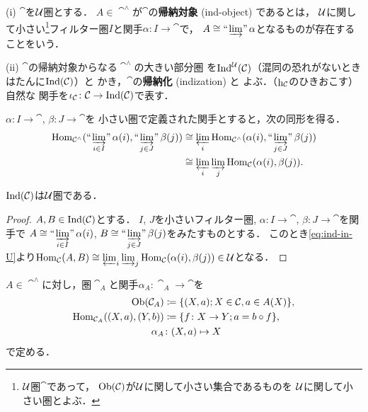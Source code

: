 \begin{Definition}
    (i) 
    $\cat$を$\mathcal{U}$圏とする．
    $A\in\cat^\wedge$が$\cat$の\textbf{帰納対象} (ind-object) であるとは，
    $\mathcal{U}$に関して小さい\footnote{
        $\mathcal{U}$圏$\cat$であって，
        $\mathop{\textrm{Ob}}\nolimits(\mathcal{C})$が$\mathcal{U}$に関して小さい集合であるものを
        $\mathcal{U}$に関して小さい圏とよぶ．
    }フィルター圏$I$と関手$\alpha\colon I\to\cat$で，
    $A\cong\mathop{\text{``}\hspace{-0.7pt}\varinjlim\hspace{-1.5pt}\text{''}}\alpha$となるものが存在することをいう．

    (ii) 
    $\cat$の帰納対象からなる$\cat^\wedge$の大きい部分圏
    を$\mathop{\mathrm{Ind}}^\mathcal{U}(\mathcal{C})$（混同の恐れがないときはたんに$\mathop{\mathrm{Ind}}(\mathcal{C})$）と
    かき，$\cat$の\textbf{帰納化} (indization) と
    よぶ．（$\mathop{\mathrm{h}}\nolimits_{\mathcal{C}}$のひきおこす）自然な
    関手を$\iota_{\mathcal{C}}\colon\mathcal{C}\to\mathop{\mathrm{Ind}}(\mathcal{C})$で表す．
\end{Definition}

$\alpha\colon I\to\cat$, $\beta\colon J\to\cat$を
小さい圏で定義された関手とすると，次の同形を得る．
\begin{equation}
    \begin{aligned}\label{eq:ind-in-U}
        \Hom_{\cat^\wedge}(
            \ind<\varinjlim_{i\in I}>\alpha(i),\ind<\varinjlim_{j\in J}>\beta(j)
            )
        &\cong\varprojlim_i\Hom_{\cat^\wedge}(\alpha(i),\ind<\varinjlim_{j\in J}>\beta(j))\\
        &\cong\varprojlim_i\varinjlim_j\Hom_{\cat}(\alpha(i),\beta(j)).
    \end{aligned}
\end{equation}


\begin{Lemma}
    $\mathop{\mathrm{Ind}}(\mathcal{C})$は$\mathcal{U}$圏である．
\end{Lemma}
\begin{proof}
    $A,B\in\mathop{\mathrm{Ind}}(\mathcal{C})$とする．
    $I$, $J$を小さいフィルター圏, 
    $\alpha\colon I\to\cat$, $\beta\colon J\to\cat$を関手で
    $A\cong\ind<\varinjlim_{i\in I}>\alpha(i)$, 
    $B\cong\ind<\varinjlim_{j\in J}>\beta(j)$をみたすものとする．
    このとき\eqref{eq:ind-in-U}より$\mathop{\mathrm{Hom}}\nolimits_{\mathcal{C}}(A,B)\cong\varprojlim_i\varinjlim_j\mathop{\mathrm{Hom}}\nolimits_{\mathcal{C}}(\alpha(i),\beta(j))\in\mathcal{U}$となる．
\end{proof}

$A\in\cat^\wedge$に対し，圏$\cat_A$と関手$\alpha_A\colon\cat_A\to\cat$を
\begin{align*}
    \mathop{\textrm{Ob}}\nolimits(\mathcal{C}_A)&\coloneqq
    \{(X,a);X\in\mathcal{C},a\in A(X)\},\\
    \mathop{\mathrm{Hom}}\nolimits_{\mathcal{C}_A}((X,a),(Y,b))&\coloneqq
    \{f\colon X\to Y; a=b\circ f\},\\
    \alpha_A&\colon (X,a)\mapsto X
\end{align*}
で定める．



